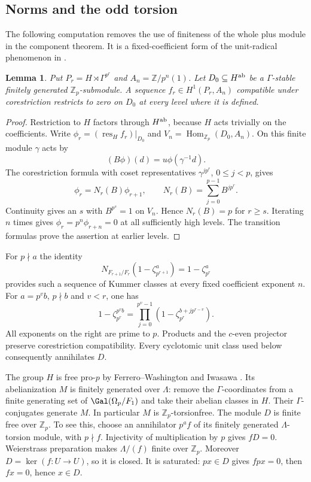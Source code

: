 \documentclass[11pt]{article}
\newtheorem{lemma}[theorem]{Lemma}
\theoremstyle{definition}\newtheorem{definition}[theorem]{Definition}
\newcommand{\Z}{\mathbb Z}\newcommand{\Q}{\mathbb Q}
\newcommand{\Hom}{\operatorname{Hom}}\newcommand{\Cl}{\operatorname{Cl}}
\begin{document}
\subsection{Norms and the odd torsion}

The following computation removes the use of finiteness of the whole
plus module in the component theorem. It is a fixed-coefficient
form of the unit-radical phenomenon in
\cite[Theorem~3, p.~3]{McCallum}.
\begin{lemma}\label{lem:norms}
Put $P_r=H\rtimes\Gamma^{p^r}$ and $A_n=\Z/p^n(1)$.
Let $D_0\subseteq H^{\rm ab}$ be a $\Gamma$-stable finitely
generated $\Z_p$-submodule. A sequence
$f_r\in H^1(P_r,A_n)$ compatible under corestriction restricts
to zero on $D_0$ at every level where it is defined.
\end{lemma}
\begin{proof}
Restriction to $H$ factors through $H^{\rm ab}$, because $H$
acts trivially on the coefficients. Write
$\phi_r=(\operatorname{res}_Hf_r)|_{D_0}$ and
$V_n=\Hom_{\Z_p}(D_0,A_n)$. On this finite module $\gamma$ acts by
\[
                  (B\phi)(d)=u\phi(\gamma^{-1}d).
\]
The corestriction formula with coset representatives
$\gamma^{jp^r}$, $0\leq j<p$, gives
\[
 \phi_r=N_r(B)\phi_{r+1},\qquad
 N_r(B)=\sum_{j=0}^{p-1}B^{jp^r}.
\]
Continuity gives an $s$ with $B^{p^s}=1$ on $V_n$.
Hence $N_r(B)=p$ for $r\geq s$. Iterating $n$ times gives
$\phi_r=p^n\phi_{r+n}=0$ at all sufficiently high levels.
The transition formulas prove the assertion at earlier levels.
\end{proof}

For $p\nmid a$ the identity
\[
 N_{F_{r+1}/F_r}(1-\zeta_{p^{r+1}}^a)=1-\zeta_{p^r}^a
\]
provides such a sequence of Kummer classes at every fixed coefficient
exponent $n$. For $a=p^vb$, $p\nmid b$ and $v<r$, one has
\[
 1-\zeta_{p^r}^{p^vb}
   =\prod_{j=0}^{p^v-1}(1-\zeta_{p^r}^{b+jp^{r-v}}).
\]
All exponents on the right are prime to $p$. Products and the
$c$-even projector preserve corestriction compatibility.
Every cyclotomic unit class used below consequently annihilates $D$.

The group $H$ is free pro-$p$ by Ferrero--Washington and
Iwasawa \cite[Theorem~2, pp.~273--274]{Iwasawa}.
Its abelianization $M$ is finitely generated over $\Lambda$:
remove the $\Gamma$-coordinates from a finite generating set of
$\Gal(\Omega_p/F_1)$ and take their abelian classes in $H$.
Their $\Gamma$-conjugates generate $M$.
In particular $M$ is $\Z_p$-torsionfree.
The module $D$ is finite free over $\Z_p$. To see this, choose
an annihilator $p^af$ of its finitely generated $\Lambda$-torsion
module, with $p\nmid f$. Injectivity of multiplication by $p$
gives $fD=0$. Weierstrass preparation makes $\Lambda/(f)$ finite
over $\Z_p$. Moreover $D=\ker(f:U\to U)$, so it is closed.
It is saturated: $px\in D$ gives $fpx=0$, then $fx=0$, hence
$x\in D$.
\end{document}
